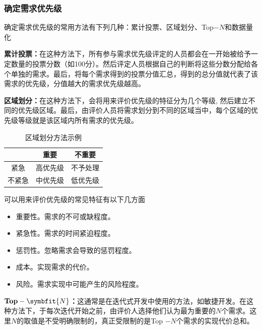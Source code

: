 \subsubsection{确定需求优先级}
确定需求优先级的常用方法有下列几种：累计投票、区域划分、Top$-N$和数据量化

\textbf{累计投票：}在这种方法下，所有参与需求优先级评定的人员都会在一开始被给予一定数量的投票分数（如100分）。然后评定人员根据自己的判断将这些分数分配给各个单独的需求。最后，将每个需求得到的投票分值汇总，得到的总分值就代表了该需求的优先级，分值越大的需求优先级越高。

\textbf{区域划分：}在这种方法下，会将用来评价优先级的特征分为几个等级, 然后建立不同的优先级区域。最后，由评价人员将需求划分到不同的区域当中，每个区域的优先级等级就是该区域内所有需求的优先级。

\begin{table}[H]
    \centering
    \begin{tabular}{|c|c|c|}
    \hline
     & 重要 & 不重要 \\ \hline
    紧急 & 高优先级 & 不予处理 \\ \hline
    不紧急 & 中优先级 & 低优先级 \\ \hline
    \end{tabular}
    \vspace{-0.3em}
    \caption*{区域划分方法示例}
    \vspace{-1em}
\end{table}

可以用来评价优先级的常见特征有以下几方面
\vspace{-0.8em}
\begin{multicols}{2}
    \begin{itemize}
        \item 重要性。需求的不可或缺程度。
        \item 紧急性。需求的时间紧迫程度。
        \item 惩罚性。忽略需求会导致的惩罚程度。
        \item 成本。实现需求的代价。
        \item 风险。需求实现中可能产生的风险程度。 
    \end{itemize}
\end{multicols}
\vspace{-1em}

$\mathbf{Top}-\symbfit{N}$\textbf{：}这通常是在迭代式开发中使用的方法，如敏捷开发。在这种方法下，于每次迭代开始之前，由评价人选择他们认为最为重要的$N$个需求。这里$N$的取值是不受明确限制的，真正受限制的是Top $-N$个需求的实现代价总和。

